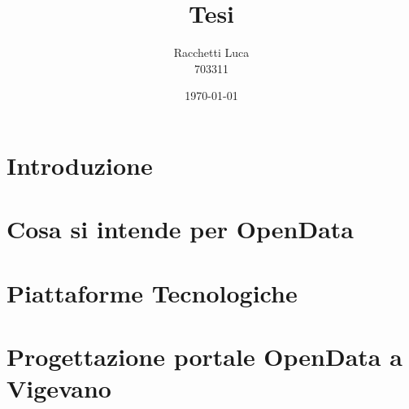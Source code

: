 \documentclass[a4paper,12pt]{report}  %
\author{Racchetti Luca\\703311}
\title{Tesi}
\date{\today}
\begin{document}


\maketitle %
\newpage %


\tableofcontents %
\newpage %


\chapter{Introduzione} 
	
	
\newpage %


\chapter{Cosa si intende per OpenData} 
	
	
\newpage %


\chapter{Piattaforme Tecnologiche} 
	
	
	
\newpage %


\chapter{Progettazione portale OpenData a Vigevano} 
	
	
	
\newpage %
\end{document}
